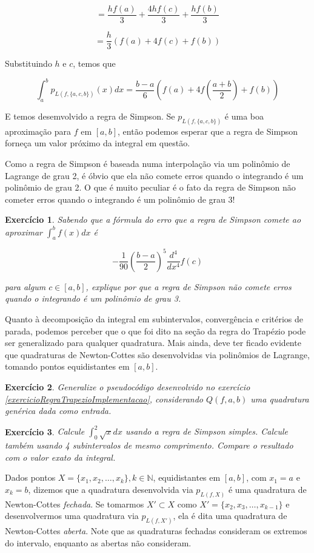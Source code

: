 \documentclass[]{article}
\newtheorem{exercicio}{Exercício}
\numberwithin{equation}{section}
\begin{document}
$$
= \frac{hf(a)}{3} + \frac{4hf(c)}{3} + \frac{hf(b)}{3}
$$

$$
= \frac{h}{3} (f(a) + 4f(c) + f(b))
$$

Substituindo $h$ e $c$, temos que

$$
\int_{a}^{b} p_{L(f, \{a, c, b\})}(x) dx = \frac{b - a}{6} \left(f(a) + 4f\left(\frac{a + b}{2}\right) + f(b)\right)
$$

E temos desemvolvido a regra de Simpson. Se $p_{L(f, \{a, c, b\})}$ é uma boa aproximação para $f$ em $[a, b]$, então podemos esperar que a regra de Simpson forneça um valor próximo da integral em questão.

Como a regra de Simpson é baseada numa interpolação via um polinômio de Lagrange de grau 2, é óbvio que ela não comete erros quando o integrando é um polinômio de grau 2. O que é muito peculiar é o fato da regra de Simpson não cometer erros quando o integrando é um polinômio de grau 3!

\begin{exercicio}
	Sabendo que a fórmula do erro que a regra de Simpson comete ao aproximar $\int_{a}^{b} f(x) dx$ é

$$
- \frac{1}{90} \left(\frac{b - a}{2}\right)^5 \frac{d^4}{dx^4} f(c)
$$

	para algum $c \in [a, b]$, explique por que a regra de Simpson não comete erros quando o integrando é um polinômio de grau 3.
\end{exercicio}

Quanto à decomposição da integral em subintervalos, convergência e critérios de parada, podemos perceber que o que foi dito na seção da regra do Trapézio pode ser generalizado para qualquer quadratura. Mais ainda, deve ter ficado evidente que quadraturas de Newton-Cottes são desenvolvidas via polinômios de Lagrange, tomando pontos equidistantes em $[a, b]$.

\begin{exercicio}
	Generalize o pseudocódigo desenvolvido no exercício \ref{exercicioRegraTrapezioImplementacao}, considerando $Q(f, a, b)$ uma quadratura genérica dada como entrada.
\end{exercicio}

\begin{exercicio}
	Calcule $\int_{0}^{2}\sqrt{x}dx$ usando a regra de Simpson simples. Calcule também usando 4 subintervalos de mesmo comprimento. Compare o resultado com o valor exato da integral.
\end{exercicio}

Dados pontos $X = \{x_1, x_2, \dots, x_k\}, k \in \mathbb{N}$, equidistantes em $[a, b]$, com $x_1 = a$ e $x_k = b$, dizemos que a quadratura desenvolvida via $p_{L(f, X)}$ é uma quadratura de Newton-Cottes \emph{fechada}. Se tomarmos $X' \subset X$ como $X' = \{x_2, x_3, \dots, x_{k - 1}\}$ e desenvolvermos uma quadratura via $p_{L(f, X')}$, ela é dita uma quadratura de Newton-Cottes \emph{aberta}. Note que as quadraturas fechadas consideram os extremos do intervalo, enquanto as abertas não consideram.
\end{document}
